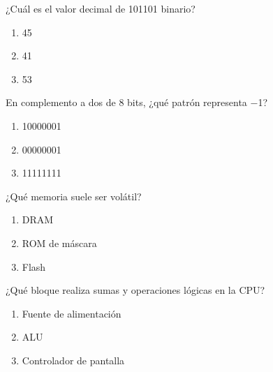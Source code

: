 \noindent\begin{minipage}{\linewidth}\setlength{\parskip}{4pt}\label{q:H-024}
¿Cuál es el valor decimal de 101101 binario?
\begin{enumerate}[label=\Alph*),nosep]
\item 45
\item 41
\item 53
\end{enumerate}\end{minipage}\par\medskip

\noindent\begin{minipage}{\linewidth}\setlength{\parskip}{4pt}\label{q:H-025}
En complemento a dos de 8 bits, ¿qué patrón representa −1?
\begin{enumerate}[label=\Alph*),nosep]
\item 10000001
\item 00000001
\item 11111111
\end{enumerate}\end{minipage}\par\medskip

\noindent\begin{minipage}{\linewidth}\setlength{\parskip}{4pt}\label{q:H-026}
¿Qué memoria suele ser volátil?
\begin{enumerate}[label=\Alph*),nosep]
\item DRAM
\item ROM de máscara
\item Flash
\end{enumerate}\end{minipage}\par\medskip

\noindent\begin{minipage}{\linewidth}\setlength{\parskip}{4pt}\label{q:H-027}
¿Qué bloque realiza sumas y operaciones lógicas en la CPU?
\begin{enumerate}[label=\Alph*),nosep]
\item Fuente de alimentación
\item ALU
\item Controlador de pantalla
\end{enumerate}\end{minipage}\par\medskip

